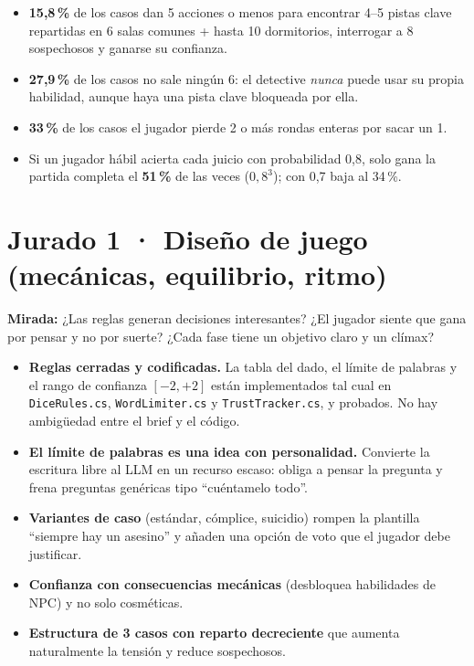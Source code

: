 \documentclass[11pt,a4paper]{article}
\newcommand{\file}[1]{\texttt{\small #1}}
\begin{document}
\begin{itemize}
\item \textbf{15,8\,\%} de los casos dan 5 acciones o menos para encontrar 4--5 pistas clave repartidas
en 6 salas comunes + hasta 10 dormitorios, interrogar a 8 sospechosos y ganarse su confianza.
\item \textbf{27,9\,\%} de los casos no sale ningún 6: el detective \emph{nunca} puede usar su propia
habilidad, aunque haya una pista clave bloqueada por ella.
\item \textbf{33\,\%} de los casos el jugador pierde 2 o más rondas enteras por sacar un 1.
\item Si un jugador hábil acierta cada juicio con probabilidad 0,8, solo gana la partida completa
el \textbf{51\,\%} de las veces ($0{,}8^3$); con 0,7 baja al 34\,\%.
\end{itemize}

\section{Jurado 1 · Diseño de juego (mecánicas, equilibrio, ritmo)}

\begin{perfil}
\textbf{Mirada:} ¿Las reglas generan decisiones interesantes? ¿El jugador siente que gana por pensar
y no por suerte? ¿Cada fase tiene un objetivo claro y un clímax?
\end{perfil}

\begin{fuerte}
\begin{itemize}
\item \textbf{Reglas cerradas y codificadas.} La tabla del dado, el límite de palabras y el rango de
confianza $[-2,+2]$ están implementados tal cual en \file{DiceRules.cs}, \file{WordLimiter.cs} y
\file{TrustTracker.cs}, y probados. No hay ambigüedad entre el brief y el código.
\item \textbf{El límite de palabras es una idea con personalidad.} Convierte la escritura libre al
LLM en un recurso escaso: obliga a pensar la pregunta y frena preguntas genéricas tipo
``cuéntamelo todo''.
\item \textbf{Variantes de caso} (estándar, cómplice, suicidio) rompen la plantilla ``siempre hay un
asesino'' y añaden una opción de voto que el jugador debe justificar.
\item \textbf{Confianza con consecuencias mecánicas} (desbloquea habilidades de NPC) y no solo
cosméticas.
\item \textbf{Estructura de 3 casos con reparto decreciente} que aumenta naturalmente la tensión y
reduce sospechosos.
\end{itemize}
\end{fuerte}
\end{document}
